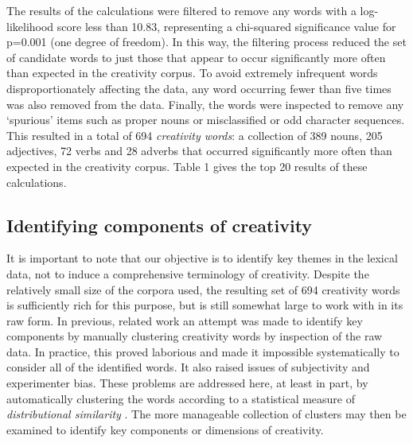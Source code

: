 \documentclass[10pt,letterpaper]{article}
\begin{document}
The results of the calculations were filtered to remove any words with a log-likelihood score less than 10.83, representing a chi-squared significance value for p=0.001 (one degree of freedom). In this way, the filtering process reduced the set of candidate words to just those that appear to occur significantly more often than expected in the creativity corpus. To avoid extremely infrequent words disproportionately affecting the data, any word occurring fewer than five times was also removed from the data. Finally, the words were inspected to remove any `spurious' items such as proper nouns or misclassified or odd character sequences. This resulted in a total of 694 {\em creativity words\/}: a collection of 389 nouns, 205 adjectives, 72 verbs and 28 adverbs that occurred significantly more often than expected in the creativity corpus. Table 1 %
gives the top 20 results of these calculations.



\subsection*{Identifying components of creativity}
\label{creat-comps}

It is important to note that our objective is to identify key themes in the lexical data, not to induce a comprehensive terminology of creativity. Despite the relatively small size of the corpora used, the resulting set of 694 creativity words is sufficiently rich for this purpose, but is still somewhat large to work with in its raw form. In previous, related work \cite{jordanous10a} an attempt was made to identify key components by manually clustering creativity words by inspection of the raw data. In practice, this proved laborious and made it impossible systematically to consider all of the identified words. It also raised issues of subjectivity and experimenter bias. These problems are addressed here, at least in part, by automatically clustering the words according to a statistical measure of {\em distributional similarity\/} \cite{lin98}.  The more manageable collection of clusters may then be examined to identify key components or dimensions of creativity.
\end{document}
